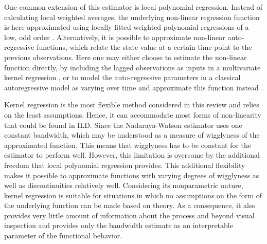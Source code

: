 One common extension of this estimator is local polynomial regression. Instead
of
calculating local weighted averages, the underlying non-linear regression
function
is here approximated using locally fitted weighted polynomial regressions of a
low, odd order \parencite{fan_adaptive_1995, ruppert_multivariate_1994,
    fan_local_2018, avery_literature_nodate}. Alternatively, it is possible
to approximate non-linear auto-regressive functions,
which relate the state value at a certain time point to the previous
observations.
Here one may either choose to estimate the non-linear function directly, by
including
the lagged observations as inputs in a multivariate kernel regression
\parencite{tsay_nonlinear_2019, schimek_multivariate_2000}, or to model the
auto-regressive
parameters in a classical autoregressive model as varying over time and
approximate this function
instead \parencite{haslbeck_tutorial_2021, shim_kernel_2009}.

Kernel regression is the most flexible method considered in this review and
relies on the least assumptions.
Hence, it can accommodate most forms of non-linearity that could be found in
ILD. Since the Nadaraya-Watson
estimator uses one constant bandwidth, which may be understood as a measure of
wigglyness of the approximated function.
This means that wigglyness has to be constant for the estimator to perform
well. However,
this limitation is overcome by the additional freedom that local polynomial
regression provides. This additional
flexibility makes it possible to approximate functions with varying degrees of
wigglyness as
well as discontinuities relatively well. Considering its nonparametric nature,
kernel regression is suitable for situations
in which no assumptions on the form of the underlying function can be made
based on theory. As a consequence,
it also provides very little amount of information about the process and beyond
visual inspection and
provides only the bandwidth estimate as an interpretable parameter of the
functional behavior.
